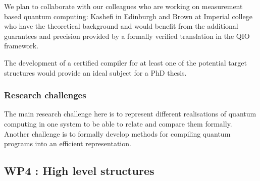 \documentclass[a4paper]{article}
\begin{document}
We plan to collaborate with our colleagues who are working on
measurement based quantum computing: Kashefi in Edinburgh and
Brown at Imperial college who have the theoretical background and
would benefit from the additional guarantees and precision provided
by a formally verified translation in the QIO framework.

The development of a certified compiler for at least one of the
potential target structures would provide an ideal subject for a PhD
thesis. 



\subsubsection*{Research challenges}

The main research challenge here is to represent different realisations
of quantum computing in one system to be able to relate and compare
them formally. Another challenge is to formally develop methods
for compiling quantum programs into an efficient representation.

\subsection*{WP4 : High level structures}
\label{sec:wp4}
\end{document}

